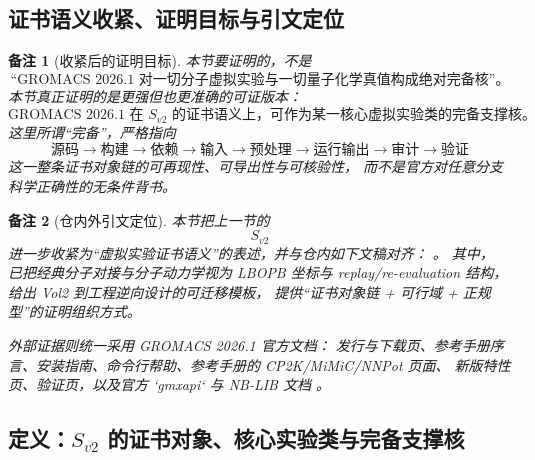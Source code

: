 \documentclass[12pt]{article}
\newtheorem{remark}{备注}[section]
\begin{document}
\begin{CJK*}{UTF8}{gkai}
\subsection{证书语义收紧、证明目标与引文定位}
\label{subsec:tex39-ch2-convention}

\begin{remark}[收紧后的证明目标]
本节要证明的，不是
\[
  \text{“GROMACS 2026.1 对一切分子虚拟实验与一切量子化学真值构成绝对完备核”。}
\]
本节真正证明的是更强但也更准确的可证版本：
\[
  \boxed{
    \text{GROMACS 2026.1 在 }S_{v2}\text{ 的证书语义上，}
    \text{可作为某一核心虚拟实验类的完备支撑核。}
  }
\]
这里所谓“完备”，严格指向
\[
  \text{源码}
  \to
  \text{构建}
  \to
  \text{依赖}
  \to
  \text{输入}
  \to
  \text{预处理}
  \to
  \text{运行输出}
  \to
  \text{审计}
  \to
  \text{验证}
\]
这一整条证书对象链的可再现性、可导出性与可核验性，
而不是官方对任意分支科学正确性的无条件背书。
\end{remark}

\begin{remark}[仓内外引文定位]
本节把上一节的
\[
  S_{v2}
\]
进一步收紧为“虚拟实验证书语义”的表述，并与仓内如下文稿对齐：
\cite{GaoZhengAppVol2,RepoTex22Vol2InverseDesign,RepoTex38JacobiBianchiRepair}。
其中，\cite{GaoZhengAppVol2} 已把经典分子对接与分子动力学视为 LBOPB 坐标与 replay/re-evaluation 结构，
\cite{RepoTex22Vol2InverseDesign} 给出 Vol2 到工程逆向设计的可迁移模板，
\cite{RepoTex38JacobiBianchiRepair} 提供“证书对象链 + 可行域 + 正规型”的证明组织方式。

外部证据则统一采用 GROMACS 2026.1 官方文档：
发行与下载页、参考手册序言、安装指南、命令行帮助、参考手册的 CP2K/MiMiC/NNPot 页面、
新版特性页、验证页，以及官方 `gmxapi` 与 NB-LIB 文档
\cite{Gromacs2026ReleaseNotes,Gromacs2026Downloads,Gromacs2026Preface,Gromacs2026InstallGuide,Gromacs2026Grompp,
  Gromacs2026Mdrun,Gromacs2026Dump,Gromacs2026CP2K,Gromacs2026MiMiC,Gromacs2026NNPot,Gromacs2026Features,
  Gromacs2026Validation,Gromacs2026Gmxapi,Gromacs2026NBLIB}。
\end{remark}

\subsection{定义：\texorpdfstring{$S_{v2}$}{S-v2} 的证书对象、核心实验类与完备支撑核}
\label{subsec:tex39-ch2-definitions}


\end{CJK*}
\end{document}
